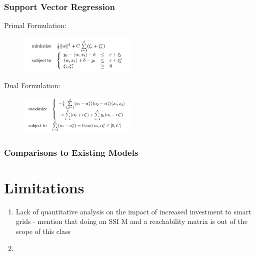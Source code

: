 \documentclass[plain]{article}
\newcommand{\1}{\mathbbm{1}}
\begin{document}
\subsubsection{Support Vector Regression}

Primal Formulation:
\begin{figure}[H]
	\centering
	\includegraphics[width=0.5\textwidth]{svm_primal.PNG}
	\caption{}
	\label{fig:}
\end{figure}

Dual Formulation:
\begin{figure}[H]
	\centering
	\includegraphics[width=0.5\textwidth]{svm_dual.PNG}
	\caption{}
	\label{fig:}

\end{figure}

\subsubsection{Comparisons to Existing Models}


\section{Limitations}
\begin{enumerate}
	\item Lack of quantitative analysis on the impact of increased investment to smart grids - mention that doing an SSI M and a reachability matrix is out of the scope of this class
	\item 
\end{enumerate}

\end{document}
